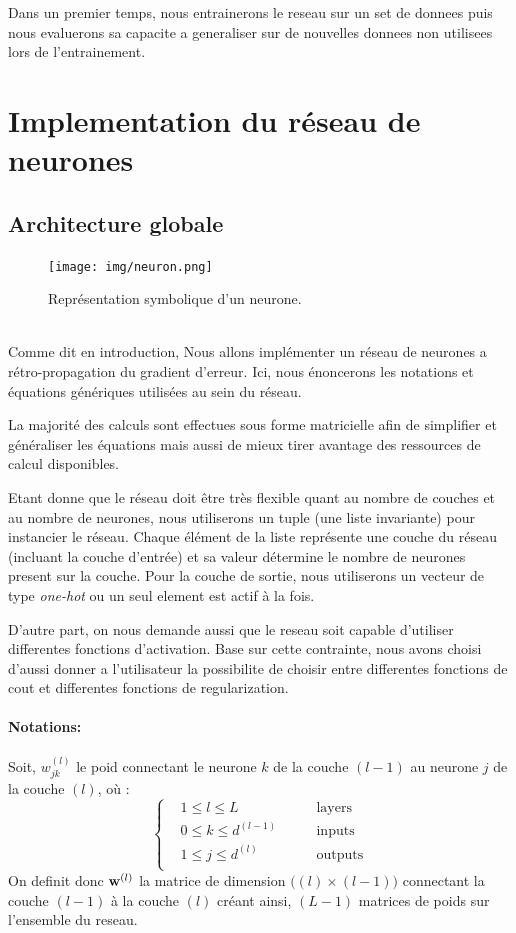 \documentclass[11pt]{article}
\begin{document}
Dans un premier temps, nous entrainerons le reseau sur un set de donnees puis
nous evaluerons sa capacite a generaliser sur de nouvelles donnees non utilisees
lors de l'entrainement.

\section{Implementation du r\'eseau de neurones}
\subsection{Architecture globale}
\begin{figure}[htp]
	\centering
	\texttt{[image: img/neuron.png]}
	\caption{Repr\'esentation symbolique d'un neurone.}
\end{figure} \\

Comme dit en introduction, Nous allons impl\'ementer un r\'eseau de neurones a
r\'etro-propagation du gradient d'erreur. Ici, nous \'enoncerons les notations et
\'equations g\'en\'eriques utilis\'ees au sein du r\'eseau.

La majorit\'e des calculs sont effectues sous forme matricielle afin de simplifier
et g\'en\'eraliser les \'equations mais aussi de mieux tirer avantage des ressources
de calcul disponibles.

Etant donne que le r\'eseau doit \^etre tr\`es flexible quant au nombre de
couches et au nombre de neurones, nous utiliserons un tuple (une liste
invariante) pour instancier le r\'eseau.
Chaque \'el\'ement de la liste repr\'esente une couche du r\'eseau
(incluant la couche d'entr\'ee) et sa valeur d\'etermine le nombre de neurones
present sur la couche.
Pour la couche de sortie, nous utiliserons un vecteur de
type \emph{one-hot} ou un seul element est actif \`a la fois.

D'autre part, on nous demande aussi que le reseau soit capable d'utiliser
differentes fonctions d'activation. Base sur cette contrainte, nous avons
choisi d'aussi donner a l'utilisateur la possibilite de choisir entre
differentes fonctions de cout et differentes fonctions de regularization.

\paragraph{Notations: }Soit, $w_{jk}^{(l)}$ le poid connectant le neurone $k$
de la couche $(l-1)$ au neurone $j$ de la couche $(l)$, o\`u :
$$
\left \{
	\begin{aligned}
		&1 \le l \le L         &\qquad \text{layers} \\
		&0 \le k \le d^{(l-1)} &\qquad \text{inputs} \\
		&1 \le j \le d^{(l)}   &\qquad \text{outputs}\\
	\end{aligned}
\right .
$$
On definit donc ${\bf w}^{(l)}$ la matrice de dimension $\Big((l) \times (l-1)\Big)$
connectant la couche $(l-1)$ \`a la couche $(l)$ cr\'eant ainsi, $(L-1)$ matrices
de poids sur l'ensemble du reseau. \\
\end{document}
